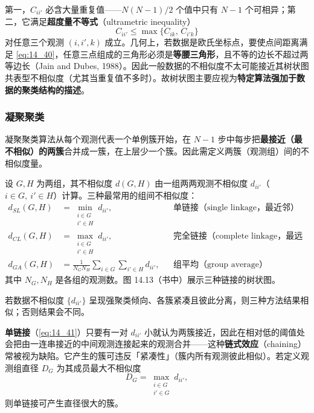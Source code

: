 \begin{remark}[共表型不相似度是非常受限的度量]
第一，$C_{ii'}$ 必含大量重复值——$N(N-1)/2$ 个值中只有 $N-1$ 个可相异；第二，它满足\textbf{超度量不等式}（ultrametric inequality）
\begin{equation}
C_{ii'} \le \max\{C_{ik},\,C_{i'k}\} \label{eq:14_40}
\end{equation}
对任意三个观测 $(i,i',k)$ 成立。几何上，若数据是欧氏坐标点，要使点间距离满足 \eqref{eq:14_40}，任意三点组成的三角形必须是\textbf{等腰三角形}，且不等的边长不超过两等边长（Jain and Dubes, 1988）。因此一般数据的不相似度不太可能接近其树状图共表型不相似度（尤其当重复值不多时）。故树状图主要应视为\textbf{特定算法强加于数据的聚类结构的描述}。
\end{remark}

\subsubsection{凝聚聚类}

凝聚聚类算法从每个观测代表一个单例簇开始，在 $N-1$ 步中每步把\textbf{最接近（最不相似）的两簇}合并成一簇，在上层少一个簇。因此需定义两簇（观测组）间的不相似度量。

设 $G,H$ 为两组，其不相似度 $d(G,H)$ 由一组两两观测不相似度 $d_{ii'}$（$i\in G,\ i'\in H$）计算。三种最常用的组间不相似度：
\begin{align}
d_{SL}(G,H) &= \min_{\substack{i\in G\\ i'\in H}} d_{ii'}, \label{eq:14_41} && \text{单链接（single linkage，最近邻）}\\
d_{CL}(G,H) &= \max_{\substack{i\in G\\ i'\in H}} d_{ii'}, \label{eq:14_42} && \text{完全链接（complete linkage，最远邻）}\\
d_{GA}(G,H) &= \frac{1}{N_G N_H}\sum_{i\in G}\sum_{i'\in H} d_{ii'}, \label{eq:14_43} && \text{组平均（group average）}
\end{align}
其中 $N_G,N_H$ 是各组的观测数。图 14.13（书中）展示三种链接的树状图。

若数据不相似度 $\{d_{ii'}\}$ 呈现强聚类倾向、各簇紧凑且彼此分离，则三种方法结果相似；否则结果会不同。

\textbf{单链接}（\eqref{eq:14_41}）只要有一对 $d_{ii'}$ 小就认为两簇接近，因此在相对低的阈值处会把由一连串接近的中间观测连接起来的观测合并——这种\textbf{链式效应}（chaining）常被视为缺陷。它产生的簇可违反「紧凑性」（簇内所有观测彼此相似）。若定义观测组直径 $D_G$ 为其成员最大不相似度
\begin{equation}
D_G = \max_{\substack{i\in G\\ i'\in G}} d_{ii'}, \label{eq:14_44}
\end{equation}
则单链接可产生直径很大的簇。

